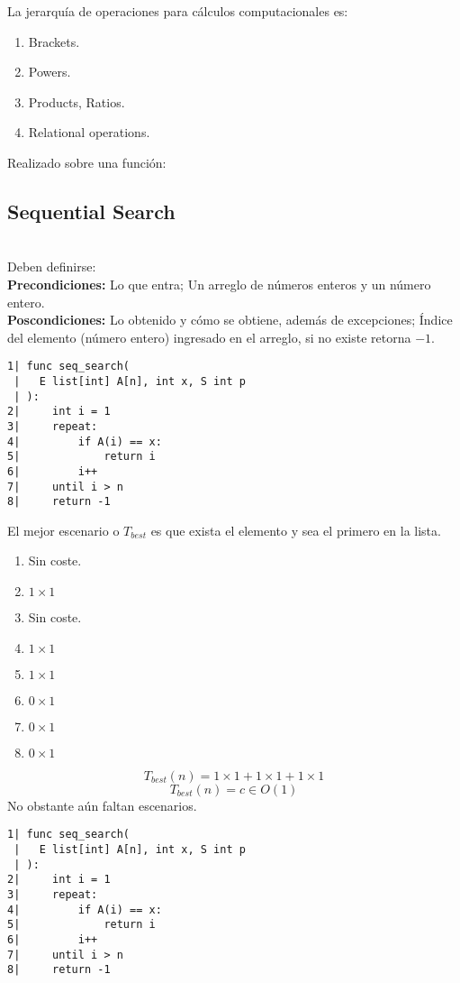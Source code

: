 \documentclass[tikz,11pt,fleqn]{book} %
\begin{document}
La jerarquía de operaciones para cálculos computacionales es:
\begin{enumerate}
    \item Brackets.
    \item Powers.
    \item Products, Ratios.
    \item Relational operations.
\end{enumerate}

Realizado sobre una función:
\subsection{Sequential Search}
\begin{example}~
\\Deben definirse:
\\\textbf{Precondiciones:} Lo que entra; Un arreglo de números enteros y un número entero.
\\\textbf{Poscondiciones:} Lo obtenido y cómo se obtiene, además de excepciones; Índice del elemento (número entero) ingresado en el arreglo, si no existe retorna $-1$.

    \begin{multicols}{2}
        \begin{lstlisting}
1| func seq_search(
 |   E list[int] A[n], int x, S int p
 | ):
2|     int i = 1
3|     repeat:
4|         if A(i) == x:
5|             return i
6|         i++
7|     until i > n
8|     return -1
        \end{lstlisting}        

        \columnbreak
        El mejor escenario o $T_{best}$ es que exista el elemento y sea el primero en la lista.
        \begin{enumerate}
            \item Sin coste.
            \item $1\times1$
            \item Sin coste.
            \item $1\times1$
            \item $1\times1$
            \item $0\times1$
            \item $0\times1$
            \item $0\times1$
        \end{enumerate}
    \end{multicols}

$$
    T_{best}(n)=1\times1+1\times1+1\times1
$$ $$
    T_{best}(n)=c\in O(1)
$$
No obstante aún faltan escenarios.
    \begin{multicols}{2}
        \begin{lstlisting}
1| func seq_search(
 |   E list[int] A[n], int x, S int p
 | ):
2|     int i = 1
3|     repeat:
4|         if A(i) == x:
5|             return i
6|         i++
7|     until i > n
8|     return -1
        \end{lstlisting}        


\end{multicols}
\end{example}
\end{document}

